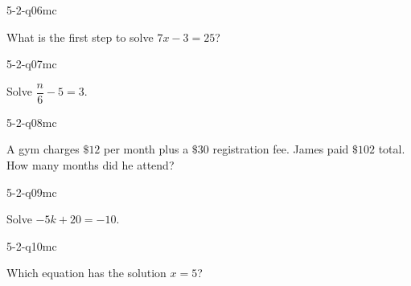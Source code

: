 \begin{practiceQuestion}{5-2-q06}{mc}
\begin{questionText}
What is the first step to solve $7x - 3 = 25$?
\end{questionText}
\end{practiceQuestion}

\begin{practiceQuestion}{5-2-q07}{mc}
\begin{questionText}
Solve $\dfrac{n}{6} - 5 = 3$.
\end{questionText}
\end{practiceQuestion}

\begin{practiceQuestion}{5-2-q08}{mc}
\begin{questionText}
A gym charges $\$12$ per month plus a $\$30$ registration fee. James paid $\$102$ total. How many months did he attend?
\end{questionText}
\end{practiceQuestion}

\begin{practiceQuestion}{5-2-q09}{mc}
\begin{questionText}
Solve $-5k + 20 = -10$.
\end{questionText}
\end{practiceQuestion}

\begin{practiceQuestion}{5-2-q10}{mc}
\begin{questionText}
Which equation has the solution $x = 5$?
\end{questionText}
\end{practiceQuestion}

